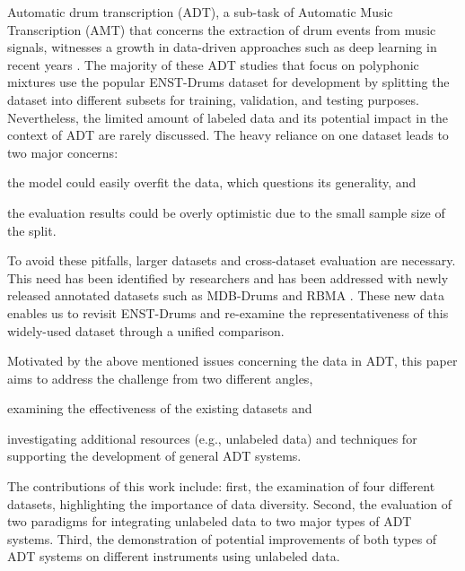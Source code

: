 \documentclass{article}
\begin{document}
Automatic drum transcription (ADT), a sub-task of Automatic Music Transcription (AMT) \cite{Benetos2013} that concerns the extraction of drum events from music signals, witnesses a growth in data-driven approaches such as deep learning in recent years \cite{Vogl2016, Southall2016, Vogl2017_icassp, Southall2017, Vogl2017_ismir}. The majority of these ADT studies that focus on polyphonic mixtures use the popular ENST-Drums dataset \cite{Gillet2006_enst} for development by splitting the dataset into different subsets for training, validation, and testing purposes. Nevertheless, the limited amount of labeled data and its potential impact in the context of ADT are rarely discussed. 
The heavy reliance on one dataset leads to two major concerns: 
\begin{inparaenum}[(i)]
	\item   the model could easily overfit the data, which questions its generality, and
    \item   the evaluation results could be overly optimistic due to the small sample size of the split. 
\end{inparaenum} 
To avoid these pitfalls, larger datasets and cross-dataset evaluation are necessary. This need has been identified by researchers and has been addressed with newly released annotated datasets such as MDB-Drums \cite{Southall2017_mdb} and RBMA \cite{Vogl2017_ismir}. These new data enables us to revisit ENST-Drums and re-examine the representativeness of this widely-used dataset through a unified comparison. 

Motivated by the above mentioned issues concerning the data in ADT, this paper aims to address the challenge from two different angles,
\begin{inparaenum}[(i)]
	\item examining the effectiveness of the existing datasets and
	\item investigating additional resources (e.g., unlabeled data) and techniques for supporting the development of general ADT systems.
\end{inparaenum} 
The contributions of this work include: first, the examination of four different datasets, highlighting the importance of data diversity. Second, the evaluation of two paradigms for integrating unlabeled data to two major types of ADT systems. Third, the demonstration of potential improvements of both types of ADT systems on different instruments using unlabeled data.
\end{document}
